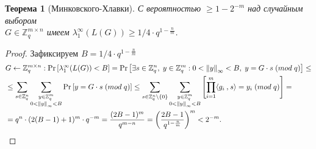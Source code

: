 \documentclass[11pt]{article}
\newtheorem{theorem}{Теорема}
\begin{document}
\begin{theorem}[Минковского-Хлавки] \label{thm:theoremMinkowskiKhlavka}
	С вероятностью $ \geq 1 - 2^{-m} $ над случайным выбором  \\
	$ G \in \mathbb{Z}_q^{m \times n} $ имеем 
	$
	\lambda_1^{\infty}(L(G)) \geq 1/4 \cdot q^{1 - \frac{n}{m}}
	$.
\end{theorem}

\begin{proof}
Зафиксируем $ B = 1/4 \cdot q^{1 - \frac{n}{m}} $
\begin{align*}
	&G \leftarrow \mathbb{Z}_q^{m \times n}: \Pr{ \left[ \lambda_1^{\infty}(L(G)) < B \right] }  = \Pr{ \left[ \exists s \in \mathbb{Z}_q^n, \; y \in \mathbb{Z}_q^m: 0 <  \left\lVert y \right\rVert_{\infty} < B, \; y = G \cdot s \; (mod \; q) \right] } \leq \\  &\leq \sum_{s \in \mathbb{Z}_q^n} \sum_{\substack{y \in \mathbb{Z}_q^m \\ 
	0 <  \left\lVert y \right\rVert_{\infty} < B}} \Pr{ \left[ y = G \cdot s \; (mod \; q) \right] }
	\leq \sum_{s \in \mathbb{Z}_q^n \backslash\{0\}} \sum_{\substack{y \in \mathbb{Z}_q^m \\ 
	0 <  \left\lVert y \right\rVert_{\infty} < B}} \left[ \prod_{i=1}^{m} \langle g_i\mathbin{,}s\rangle = y_i \; (mod \; q) \right] = \\
	&= q^n \cdot (2(B-1) + 1)^m \cdot q^{-m} = \frac{(2B-1)^m}{q^{m-n}} = \left( \frac{2B-1}{q^{1-\frac{n}{m}}}\right)^m < 2^{-m}.
\end{align*}
\end{proof}
\end{document}
